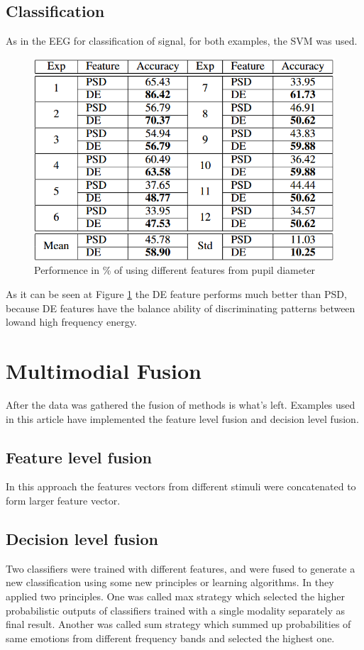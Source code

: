 \documentclass[10pt,journal,compsoc,twoside]{IEEEtran}
\newcommand{\Ref}[2]{#2 \ref{#1}}
\begin{document}
\subsection{Classification}
As in the EEG for classification of signal, for both examples, the SVM was used.
\begin{figure}[ht]
	\centering
	\includegraphics[width=1.0\linewidth]{performanceOfClassifierPupil1}
	\caption{ Performence in \% of using different features from pupil diameter \cite{WeiLongBoNanBaoLiang2014}}
	\label{fig:performanceOfClassifierPupil1}
\end{figure}
As it can be seen at \Ref{fig:performanceOfClassifierPupil1}{Figure} the DE feature performs much better than PSD, because DE features have the balance ability of discriminating patterns between  lowand high frequency energy.
 \section{Multimodial Fusion} 
After the data was gathered the fusion of methods is what's left. Examples used in this article have implemented the feature level fusion and decision level fusion. 
\subsection{Feature level fusion}
In this approach the features vectors from different stimuli were concatenated to form larger feature vector.
\subsection{Decision level fusion}
Two classifiers were trained with different features, and were fused to generate a new classification using some new principles or learning algorithms. In \cite{WeiLongBoNanBaoLiang2014} they applied two principles. One was called max strategy which selected the higher probabilistic outputs of classifiers trained with a single modality separately as final result. Another was called sum strategy which summed up probabilities of same emotions from different frequency bands and selected the highest one.
\end{document}
